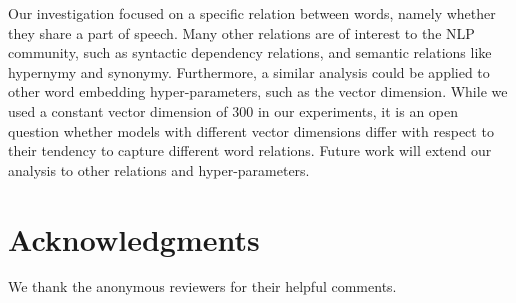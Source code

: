 \documentclass[11pt,a4paper]{article}
\begin{document}
    Our investigation focused on a specific relation between words,
    namely whether they share a part of speech.
    Many other relations are of interest to the NLP
    community, such as syntactic dependency relations,
    and semantic relations like hypernymy and synonymy.
    Furthermore, a similar analysis could be applied to other word
    embedding hyper-parameters, such as the vector dimension.
    While we used a constant vector dimension of 300 in our experiments,
    it is an open question whether models with different vector dimensions
    differ with respect to their tendency to capture different word relations.
    Future work will extend our analysis to other relations and hyper-parameters.

\section*{Acknowledgments}

We thank the anonymous reviewers for their helpful comments.

    
    
    
\end{document}
